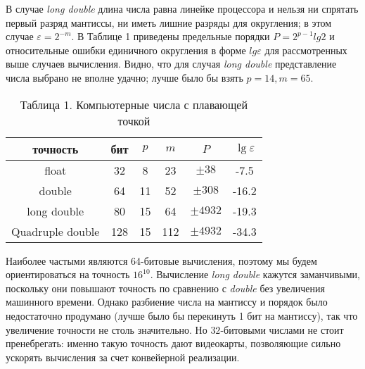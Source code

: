 В случае \textit{long double} длина числа равна линейке процессора и нельзя ни
спрятать первый разряд мантиссы, ни иметь лишние разряды для округления; в
этом случае $\varepsilon = 2^{-m}$. В Таблице 1 приведены предельные порядки $P = 2^{p-1}lg2$ и
относительные ошибки единичного округления в форме $lg\varepsilon$ для
рассмотренных выше случаев вычисления. Видно, что для случая \textit{long double}
представление числа выбрано не вполне удачно; лучше было бы взять $p = 14,m = 65$.

\begin{table}
\caption{Таблица 1. Компьютерные числа с плавающей точкой}
\begin{center}
\begin{tabular}{|c|c|c|c|c|c|}
\hline
точность & бит & $p$ & $m$ & $P$ & $\lg \varepsilon$ \\
\hline
float & 32 & 8 & 23 & $\pm 38$ & -7.5 \\
double & 64 &  11 & 52 & $\pm 308$ & -16.2 \\
long double & 80 & 15 & 64 & $\pm 4932$ & -19.3\\
Quadruple double & 128 & 15 & 112 & $\pm 4932$ & -34.3 \\
\hline
\end{tabular}
\end{center}
\end{table}

Наиболее частыми являются 64-битовые вычисления, поэтому мы будем
ориентироваться на точность $16^{10}$. Вычисление \textit{long double} кажутся
заманчивыми, поскольку они повышают точность по сравнению с \textit{double} без
увеличения машинного времени. Однако разбиение числа на мантиссу и
порядок было недостаточно продумано (лучше было бы перекинуть 1 бит на
мантиссу), так что увеличение точности не столь значительно. Но $32$-битовыми
числами не стоит пренебрегать: именно такую точность дают видеокарты,
позволяющие сильно ускорять вычисления за счет конвейерной реализации.